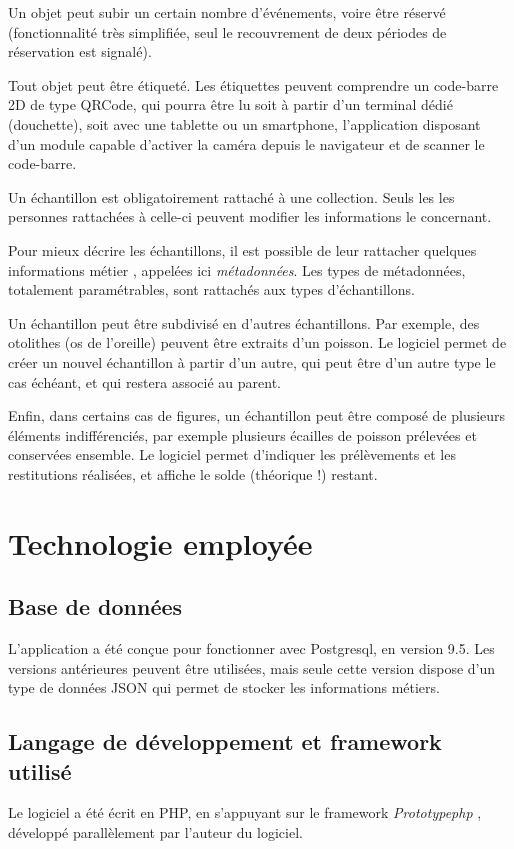 Un objet peut subir un certain nombre d'événements, voire être réservé (fonctionnalité très simplifiée, seul le recouvrement de deux périodes de réservation est signalé).

Tout objet peut être étiqueté. Les étiquettes peuvent comprendre un code-barre 2D de type QRCode, qui pourra être lu soit à partir d'un terminal dédié (douchette), soit avec une tablette ou un smartphone, l'application disposant d'un module capable d'activer la caméra depuis le navigateur et de scanner le code-barre.

Un échantillon est obligatoirement rattaché à une collection. Seuls les les personnes rattachées à celle-ci peuvent modifier les informations le concernant. 

Pour mieux décrire les échantillons, il est possible de leur rattacher quelques informations \og métier \fg{}, appelées ici \textit{métadonnées}. Les types de métadonnées, totalement paramétrables, sont rattachés aux types d'échantillons.

Un échantillon peut être subdivisé en d'autres échantillons. Par exemple, des otolithes (os de l'oreille) peuvent être extraits d'un poisson. Le logiciel permet de créer un nouvel échantillon à partir d'un autre, qui peut être d'un autre type le cas échéant, et qui restera associé au parent. 

Enfin, dans certains cas de figures, un échantillon peut être composé de plusieurs éléments indifférenciés, par exemple plusieurs écailles de poisson prélevées et conservées ensemble. Le logiciel permet d'indiquer les prélèvements et les restitutions réalisées, et affiche le solde (théorique !) restant.

\section{Technologie employée}
\subsection{Base de données}

L'application a été conçue pour fonctionner avec Postgresql, en version 9.5. Les versions antérieures peuvent être utilisées, mais seule cette version dispose d'un type de données JSON qui permet de stocker les informations métiers.

\subsection{Langage de développement et framework utilisé}
Le logiciel a été écrit en PHP, en s'appuyant sur le framework \textit{Prototypephp} \cite{prototypephp}, développé parallèlement par l'auteur du logiciel.

